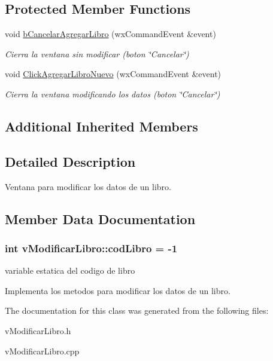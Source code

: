 \subsection*{Protected Member Functions}
\begin{DoxyCompactItemize}
\item 
void \hyperlink{classv_modificar_libro_a3180210031e47053fb7095eb7187c36c}{b\+Cancelar\+Agregar\+Libro} (wx\+Command\+Event \&event)\hypertarget{classv_modificar_libro_a3180210031e47053fb7095eb7187c36c}{}\label{classv_modificar_libro_a3180210031e47053fb7095eb7187c36c}

\begin{DoxyCompactList}\small\item\em Cierra la ventana sin modificar (boton \char`\"{}\+Cancelar\char`\"{}) \end{DoxyCompactList}\item 
void \hyperlink{classv_modificar_libro_a45e6d79ccf09a1804dd8f0eeb7deb88d}{Click\+Agregar\+Libro\+Nuevo} (wx\+Command\+Event \&event)\hypertarget{classv_modificar_libro_a45e6d79ccf09a1804dd8f0eeb7deb88d}{}\label{classv_modificar_libro_a45e6d79ccf09a1804dd8f0eeb7deb88d}

\begin{DoxyCompactList}\small\item\em Cierra la ventana modificando los datos (boton \char`\"{}\+Cancelar\char`\"{}) \end{DoxyCompactList}\end{DoxyCompactItemize}
\subsection*{Additional Inherited Members}


\subsection{Detailed Description}
Ventana para modificar los datos de un libro. 

\subsection{Member Data Documentation}
\subsubsection[{\texorpdfstring{cod\+Libro}{codLibro}}]{\setlength{\rightskip}{0pt plus 5cm}int v\+Modificar\+Libro\+::cod\+Libro = -\/1\hspace{0.3cm}{\ttfamily [static]}}\hypertarget{classv_modificar_libro_a88a10764b43adc0d365871ad2da42d28}{}\label{classv_modificar_libro_a88a10764b43adc0d365871ad2da42d28}


variable estatica del codigo de libro 

Implementa los metodos para modificar los datos de un libro. 

The documentation for this class was generated from the following files\+:\begin{DoxyCompactItemize}
\item 
v\+Modificar\+Libro.\+h\item 
v\+Modificar\+Libro.\+cpp\end{DoxyCompactItemize}
